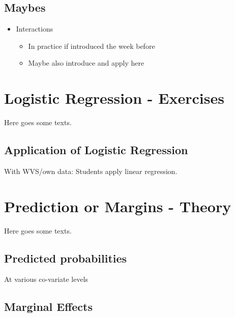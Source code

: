 \documentclass[
]{book}
\providecommand{\tightlist}{%
  \setlength{\itemsep}{0pt}\setlength{\parskip}{0pt}}
\begin{document}
\hypertarget{maybes-3}{%
\section{Maybes}\label{maybes-3}}

\begin{itemize}
\tightlist
\item
  Interactions

  \begin{itemize}
  \tightlist
  \item
    In practice if introduced the week before
  \item
    Maybe also introduce and apply here
  \end{itemize}
\end{itemize}

\hypertarget{log-e}{%
\chapter{Logistic Regression - Exercises}\label{log-e}}

Here goes some texts.

\hypertarget{application-of-logistic-regression}{%
\section{Application of Logistic Regression}\label{application-of-logistic-regression}}

With WVS/own data: Students apply linear regression.

\hypertarget{pm-t}{%
\chapter{Prediction or Margins - Theory}\label{pm-t}}

Here goes some texts.

\hypertarget{predicted-probabilities}{%
\section{Predicted probabilities}\label{predicted-probabilities}}

At various co-variate levels

\hypertarget{marginal-effects}{%
\section{Marginal Effects}\label{marginal-effects}}
\end{document}
